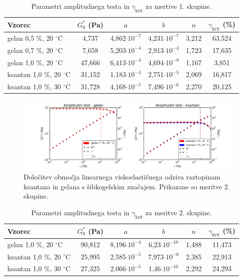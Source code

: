 \documentclass{article}
\begin{document}
\renewcommand{\arraystretch}{1.5}
\begin{table}
\centering
\caption{Parametri amplitudnega testa in $\gamma_\mathrm{krit}$ za mertive 1. skupine.}
\label{tab:ampl1} 
\begin{tabular}{ l  c  c  c  c  c }
   
   \toprule
   Vzorec & $G^*_0$ (Pa) & $a$ & $b$ & $n$ & $\gamma_\mathrm{krit}$ (\%) \\ 
   \midrule
   gelan 0,5 \%, 20 $^\circ$C   & 4,737  & 4,862$\cdot10^{-7}$ & 4,231$\cdot10^{-7} $& 3,212 & 63,524 \\ 
   gelan 0,7 \%, 20 $^\circ$C   & 7,658  & 5,203$\cdot10^{-4}$ & 2,913$\cdot10^{-4} $& 1,723 & 17,635 \\
   gelan 1,0 \%, 20 $^\circ$C   & 47,666 & 6,413$\cdot10^{-3}$ & 4,694$\cdot10^{-9} $& 1,167 & 3,851 \\
   ksantan 1,0 \%, 20 $^\circ$C & 31,152 & 1,183$\cdot10^{-4}$ & 2,751$\cdot10^{-5} $& 2,069 & 16,817 \\
   ksantan 1,0 \%, 30 $^\circ$C & 31,728 & 4,168$\cdot10^{-5}$ & 7,496$\cdot10^{-6} $& 2,270 & 20,125 \\
   \bottomrule
\end{tabular}

\end{table}

\begin{figure}
  \centering
  \includegraphics[width=\linewidth]{S2ampl.png}
  \caption{Določitev območja linearnega viskoelastičnega odziva raztopinam ksantana in gelana s šibkogelskim značajem. Prikazane so meritve 2. skupine.}
  \label{fig:ampl2}
\end{figure}

\renewcommand{\arraystretch}{1.5}
\begin{table} 
\centering
\caption{Parametri amplitudnega testa in $\gamma_\mathrm{krit}$ za meritve 2. skupine.}
\label{tab:ampl2}
\begin{tabular}{ l  c  c  c  c  c }
   \toprule
   Vzorec & $G^*_0$ (Pa) & $a$ & $b$ & $n$ & $\gamma_\mathrm{krit}$ (\%) \\ 
   \midrule
   gelan 1,0 \%, 20 $^\circ$C   & 90,812 & 8,196$\cdot10^{-4}$ & 6,23$\cdot10^{-10} $& 1,488 & 11,473 \\
   ksantan 1,0 \%, 20 $^\circ$C & 25,995 & 2,585$\cdot10^{-5}$ & 7,973$\cdot10^{-6} $& 2,385 & 22,913 \\
   ksantan 1,0 \%, 30 $^\circ$C & 27,325 & 2,066$\cdot10^{-5}$ & 1,46$\cdot10^{-10} $& 2,292 & 24,293 \\
   \bottomrule
\end{tabular}

\end{table}
\end{document}
